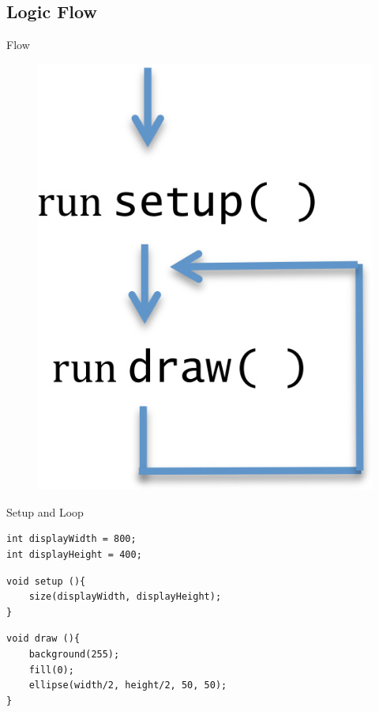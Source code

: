 \subsection{Logic Flow}
\begin{frame}[fragile]{Flow}{}
\begin{figure}
    \begin{center}
        \includegraphics[width=0.8\linewidth]{images/setup_draw.png}
    \end{center}
\end{figure}
\end{frame}

\begin{frame}[fragile]{Setup and Loop}{}
    \begin{verbatim}
int displayWidth = 800;
int displayHeight = 400;
    \end{verbatim}
    \pause
    \begin{verbatim}
void setup (){
    size(displayWidth, displayHeight);
}
    \end{verbatim}
    \pause
    \begin{verbatim}
void draw (){
    background(255);
    fill(0);
    ellipse(width/2, height/2, 50, 50);
}
    \end{verbatim}
\end{frame}


